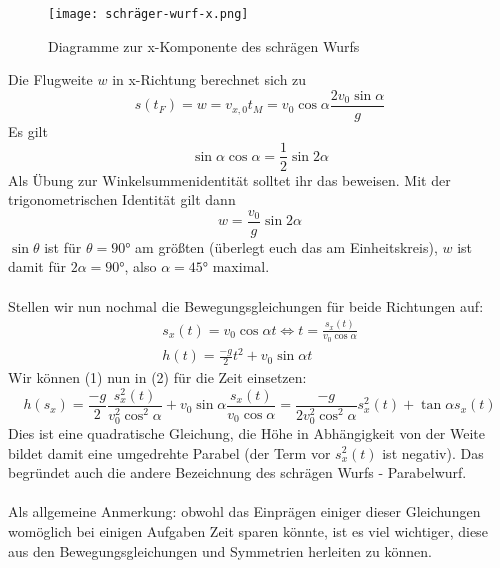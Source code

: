 \documentclass[11pt]{article}
\begin{document}
\begin{figure}[H] 
    \centering
       \texttt{[image: schräger-wurf-x.png]}
       \caption{Diagramme zur x-Komponente des schrägen Wurfs}
\end{figure} 
Die Flugweite $w$ in x-Richtung berechnet sich zu 
\begin{equation*}
    s(t_F) = w = v_{x, 0}t_M = v_0\cos\alpha\frac{2v_0\sin\alpha}{g}
\end{equation*}
Es gilt 
$$\sin\alpha\cos\alpha = \frac{1}{2} \sin2\alpha$$
Als Übung zur Winkelsummenidentität solltet ihr das beweisen. Mit der trigonometrischen Identität gilt dann
$$w=\frac{v_0}{g}\sin2\alpha$$
$\sin\theta$ ist für $\theta = 90$° am größten (überlegt euch das am Einheitskreis), $w$ ist damit für $2\alpha=90$°, also $\alpha = 45$° maximal. \\\\
Stellen wir nun nochmal die Bewegungsgleichungen für beide Richtungen auf: 
\begin{gather}
    s_x(t) = v_0\cos\alpha t \Longleftrightarrow t = \frac{s_x(t)}{v_0\cos\alpha} \\
    h(t) = \frac{-g}{2}t^2 + v_0\sin\alpha t  
\end{gather}
Wir können (1) nun in (2) für die Zeit einsetzen: 
\begin{equation}
    h(s_x) = \frac{-g}{2}\frac{s_x^2(t)}{v_0^2\cos^2\alpha} + v_0\sin\alpha\frac{s_x(t)}{v_0\cos\alpha} = \frac{-g}{2v_0^2\cos^2\alpha}s_x^2(t) +\tan\alpha s_x(t)
\end{equation}
Dies ist eine quadratische Gleichung, die Höhe in Abhängigkeit von der Weite bildet damit eine umgedrehte Parabel (der Term vor $s_x^2(t)$ ist negativ). Das begründet auch die andere Bezeichnung des schrägen Wurfs - Parabelwurf. \\\\
Als allgemeine Anmerkung: obwohl das Einprägen einiger dieser Gleichungen womöglich bei einigen Aufgaben Zeit sparen könnte, ist es viel wichtiger, diese aus den Bewegungsgleichungen und Symmetrien herleiten zu können. 
\end{document}
